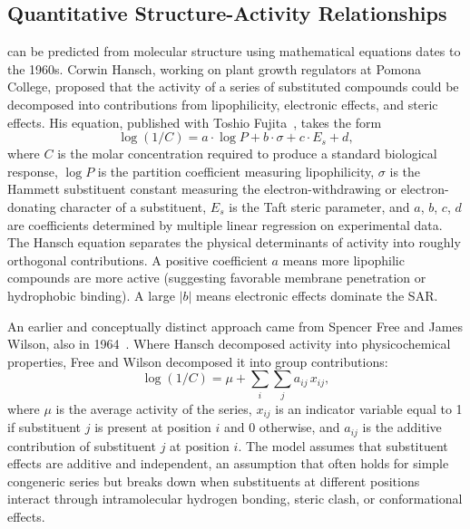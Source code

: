 \subsection{Quantitative Structure-Activity Relationships}
\label{sec:qsar}

 can be predicted from molecular structure using mathematical equations dates to the 1960s. Corwin Hansch, working on plant growth regulators at Pomona College, proposed that the activity of a series of substituted compounds could be decomposed into contributions from lipophilicity, electronic effects, and steric effects. His equation, published with Toshio Fujita~\cite{hansch1964}, takes the form
\begin{equation}
  \label{eq:hansch}
  \log(1/C) = a \cdot \log P + b \cdot \sigma + c \cdot E_s + d,
\end{equation}
where $C$ is the molar concentration required to produce a standard biological response, $\log P$ is the partition coefficient measuring lipophilicity, $\sigma$ is the Hammett substituent constant measuring the electron-withdrawing or electron-donating character of a substituent, $E_s$ is the Taft steric parameter, and $a$, $b$, $c$, $d$ are coefficients determined by multiple linear regression on experimental data. The Hansch equation separates the physical determinants of activity into roughly orthogonal contributions. A positive coefficient $a$ means more lipophilic compounds are more active (suggesting favorable membrane penetration or hydrophobic binding). A large $|b|$ means electronic effects dominate the SAR.

An earlier and conceptually distinct approach came from Spencer Free and James Wilson, also in 1964~\cite{freewilson1964}. Where Hansch decomposed activity into physicochemical properties, Free and Wilson decomposed it into group contributions:
\begin{equation}
  \label{eq:free-wilson}
  \log(1/C) = \mu + \sum_{i} \sum_{j} a_{ij} \, x_{ij},
\end{equation}
where $\mu$ is the average activity of the series, $x_{ij}$ is an indicator variable equal to 1 if substituent $j$ is present at position $i$ and 0 otherwise, and $a_{ij}$ is the additive contribution of substituent $j$ at position $i$. The model assumes that substituent effects are additive and independent, an assumption that often holds for simple congeneric series but breaks down when substituents at different positions interact through intramolecular hydrogen bonding, steric clash, or conformational effects.

